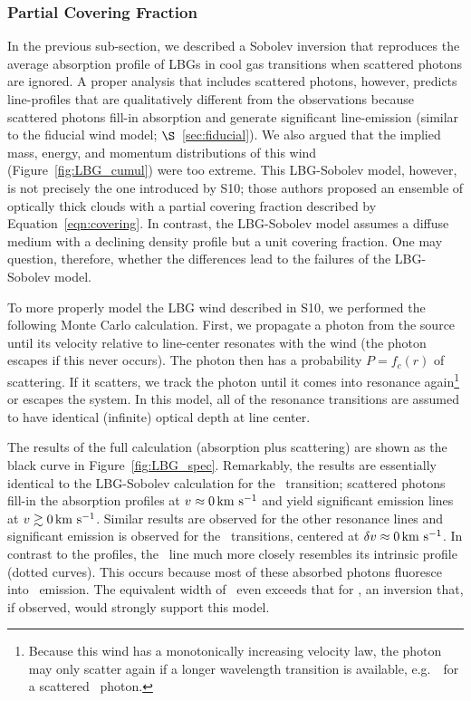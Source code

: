 \documentclass[12pt,preprint]{aastex}
\begin{document}
\subsubsection{Partial Covering Fraction}
\label{sec:Covering}

In the previous sub-section, we described a Sobolev inversion that
reproduces the average absorption profile of LBGs in cool gas
transitions when scattered photons are ignored.  A proper analysis
that includes scattered photons,
however, predicts line-profiles that are qualitatively
different from the observations because scattered photons fill-in
absorption and generate significant line-emission (similar to the
fiducial wind model; $\S$~\ref{sec:fiducial}).
We also argued that the implied mass, energy, and momentum
distributions of this wind (Figure~\ref{fig:LBG_cumul}) were too
extreme. 
This LBG-Sobolev model, however, is not precisely
the one introduced by S10;  those authors proposed an ensemble of optically
thick clouds with a partial covering fraction described by
Equation~\ref{eqn:covering}.  In contrast, the LBG-Sobolev model assumes
a diffuse medium with a declining density profile but a unit covering
fraction.  One may question, therefore,  whether the differences
lead to the failures of the LBG-Sobolev model. 

To more properly model the LBG wind described in S10, we 
performed the following Monte Carlo calculation.  First, we propagate
a photon from the source until its velocity relative to line-center
resonates with the wind (the photon escapes if this never occurs).
The photon then has a probability $P = f_c(r)$ of scattering.  If it
scatters, we track the photon until it comes into
resonance again\footnote{Because this wind has a monotonically
  increasing velocity law, the photon may only scatter again if a
  longer wavelength transition is available, e.g.\ \mgiib\ for a
  scattered \mgiia\ photon.} or escapes the system.  In this model, all of the
resonance transitions are assumed to have identical (infinite) optical
depth at line center. 

The results of the full calculation (absorption plus scattering) are
shown as the black curve in Figure~\ref{fig:LBG_spec}.  Remarkably, the results
are essentially identical to the LBG-Sobolev calculation for the
\mgiia\ transition; scattered photons fill-in
the absorption profiles at $v \approx 0 \, {\rm km~s^{-1}}$ and yield significant
emission lines at $v \gtrsim 0 \, {\rm km~s^{-1}}$. 
Similar results are observed for the other resonance lines and  
significant emission is observed 
for the \feiis\ transitions, centered at $\delta v \approx 0 \, {\rm km~s^{-1}}$.  
In contrast to the  profiles, the 
\feiia\ line much more closely resembles its intrinsic
profile (dotted curves).  This occurs because most of these
absorbed photons fluoresce into \feiis\ emission.
The equivalent width of \feiia\ even exceeds that for \feiib, an
inversion that, if observed, would strongly support this model.
\end{document}
